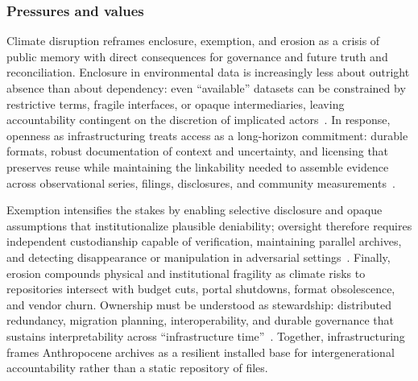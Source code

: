 \documentclass[acmsmall,screen]{acmart}
\begin{document}
\subsubsection*{Pressures and values}
Climate disruption reframes enclosure, exemption, and erosion as a crisis of public memory with direct consequences for governance and future truth and reconciliation. Enclosure in environmental data is increasingly less about outright absence than about dependency: even “available” datasets can be constrained by restrictive terms, fragile interfaces, or opaque intermediaries, leaving accountability contingent on the discretion of implicated actors~\cite{carbajalCriticalDigitalArchives2021a,blankeReassemblingDigitalArchives2024}. In response, openness as infrastructuring treats access as a long-horizon commitment: durable formats, robust documentation of context and uncertainty, and licensing that preserves reuse while maintaining the linkability needed to assemble evidence across observational series, filings, disclosures, and community measurements~\cite{tanseyArchivalAdaptationClimate2015,paschalidouStrongSustainabilityFramework2022a,orrClimateChangeCultural2021}.

Exemption intensifies the stakes by enabling selective disclosure and opaque assumptions that institutionalize plausible deniability; oversight therefore requires independent custodianship capable of verification, maintaining parallel archives, and detecting disappearance or manipulation in adversarial settings~\cite{viebachEvidenceUseArchives2022,ghaddarSpectreArchiveTruth2016}. Finally, erosion compounds physical and institutional fragility as climate risks to repositories intersect with budget cuts, portal shutdowns, format obsolescence, and vendor churn. Ownership must be understood as stewardship: distributed redundancy, migration planning, interoperability, and durable governance that sustains interpretability across ``infrastructure time''~\cite{rydenArchivistsTimeConceptions2019,danielaagostinhoBigDataTime2016,wessellKeepingArchivesWater2023}. Together, infrastructuring frames Anthropocene archives as a resilient installed base for intergenerational accountability rather than a static repository of files.
\end{document}

